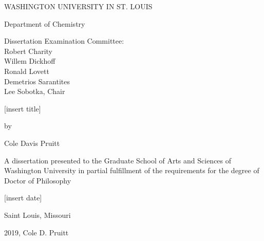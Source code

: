 \begin{titlepage}
\begin{singlespace}
  \begin{center}
        \vspace*{1cm}
        
        WASHINGTON UNIVERSITY IN ST. LOUIS
        
        \vspace{0.5cm}
        Department of Chemistry
        
        \vspace{1.5cm}

        Dissertation Examination Committee:\\
        Robert Charity\\
        Willem Dickhoff\\ 
        Ronald Lovett\\
        Demetrios Sarantites\\
        Lee Sobotka, Chair\\
    
        \vspace{1.5 cm}

        [insert title]

        \vspace{0.5 cm}

        by

        \vspace{0.5 cm}
        
        Cole Davis Pruitt
        
        \vfill
        
        A dissertation presented to the Graduate School of Arts and Sciences of Washington University in partial fulfillment of the requirements for the degree of Doctor of Philosophy
        
        \vspace{0.8cm}
        
        [insert date]
        
        \vspace{0.5 cm}
        Saint Louis, Missouri
        
      \end{center}
      \end{singlespace}
    \end{titlepage}
    
    \clearpage
    
    \vspace*{\fill}
    \begin{center}    
      \textcopyright \hspace{2pt} 2019, Cole D. Pruitt
    \end{center}
    \vspace*{\fill}
    
    \thispagestyle{empty} %
    \addtocounter{page}{-1}%
    \clearpage
